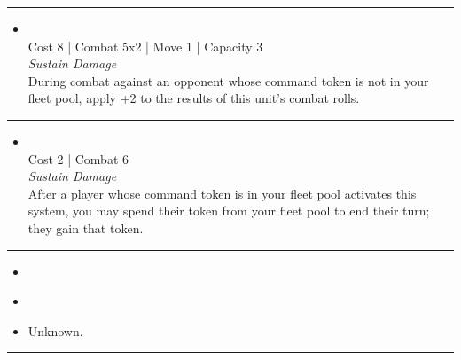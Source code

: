 \begin{multicols}{2}
\vspace{-10pt}\rule{\hsize}{0.4pt}\vspace{5pt}


\begin{itemize}
\item {}\\
Cost 8 | Combat 5x2 | Move 1 | Capacity 3 \\
\emph{Sustain Damage}\\
During combat against an opponent whose command token is not in your fleet pool, apply +2 to the results of this unit's combat rolls.
\end{itemize}

\vspace{-10pt}\rule{\hsize}{0.4pt}\vspace{5pt}


\begin{itemize}
\item {} %
\\
Cost 2 | Combat 6 \\
\emph{Sustain Damage}\\
After a player whose command token is in your fleet pool activates this system, you may spend their token from your fleet pool to end their turn; they gain that token.
\end{itemize}

\vspace{-10pt}\rule{\hsize}{0.4pt}\vspace{5pt}


\begin{itemize}
\item \legionnaireI
\end{itemize}

\columnbreak
{} %

\begin{itemize}
\item \legionnaireII
\item Unknown.
\end{itemize}

\vspace{-10pt}\rule{\hsize}{0.4pt}\vspace{5pt}


\end{multicols}

